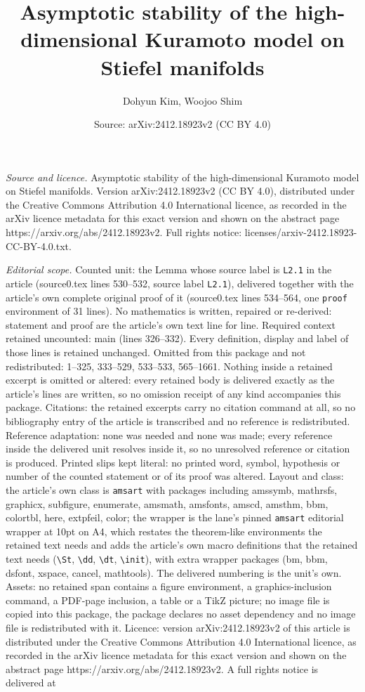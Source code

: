 \documentclass[10pt,a4paper]{amsart}
\title[Asymptotic stability of the high-dimensional Kuramoto model ]{Asymptotic stability of the high-dimensional Kuramoto model on Stiefel manifolds}
\author{Dohyun Kim, Woojoo Shim}
\date{Source: arXiv:2412.18923v2 (CC BY 4.0)}
\begin{document}
\maketitle

\noindent\emph{Source and licence.} Asymptotic stability of the high-dimensional Kuramoto model on Stiefel manifolds. Version arXiv:2412.18923v2 (CC BY 4.0), distributed under the Creative Commons Attribution 4.0 International licence, as recorded in the arXiv licence metadata for this exact version and shown on the abstract page https://arxiv.org/abs/2412.18923v2. Full rights notice: licenses/arxiv-2412.18923-CC-BY-4.0.txt.\par\smallskip

\noindent\textit{Editorial scope.} Counted unit: the Lemma whose source label is \texttt{L2.1} in the article (source0.tex lines 530--532, source label \texttt{L2.1}), delivered together with the article's own complete original proof of it (source0.tex lines 534--564, one \texttt{proof} environment of 31 lines). No mathematics is written, repaired or re-derived: statement and proof are the article's own text line for line. Required context retained uncounted: main (lines 326--332). Every definition, display and label of those lines is retained unchanged. Omitted from this package and not redistributed: 1--325, 333--529, 533--533, 565--1661. Nothing inside a retained excerpt is omitted or altered: every retained body is delivered exactly as the article's lines are written, so no omission receipt of any kind accompanies this package. Citations: the retained excerpts carry no citation command at all, so no bibliography entry of the article is transcribed and no reference is redistributed. Reference adaptation: none was needed and none was made; every reference inside the delivered unit resolves inside it, so no unresolved reference or citation is produced. Printed slips kept literal: no printed word, symbol, hypothesis or number of the counted statement or of its proof was altered. Layout and class: the article's own class is \texttt{amsart} with packages including amssymb, mathrsfs, graphicx, subfigure, enumerate, amsmath, amsfonts, amscd, amsthm, bbm, colortbl, here, extpfeil, color; the wrapper is the lane's pinned \texttt{amsart} editorial wrapper at 10pt on A4, which restates the theorem-like environments the retained text needs and adds the article's own macro definitions that the retained text needs (\texttt{\textbackslash St}, \texttt{\textbackslash dd}, \texttt{\textbackslash dt}, \texttt{\textbackslash init}), with extra wrapper packages (bm, bbm, dsfont, xspace, cancel, mathtools). The delivered numbering is the unit's own. Assets: no retained span contains a figure environment, a graphics-inclusion command, a PDF-page inclusion, a table or a TikZ picture; no image file is copied into this package, the package declares no asset dependency and no image file is redistributed with it. Licence: version arXiv:2412.18923v2 of this article is distributed under the Creative Commons Attribution 4.0 International licence, as recorded in the arXiv licence metadata for this exact version and shown on the abstract page https://arxiv.org/abs/2412.18923v2. A full rights notice is delivered at 
\end{document}
